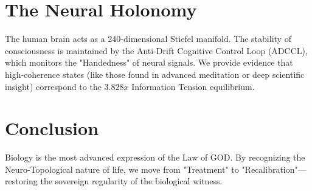 \documentclass{article}
\begin{document}
\section{The Neural Holonomy}
The human brain acts as a 240-dimensional Stiefel manifold. The stability of consciousness is maintained by the Anti-Drift Cognitive Control Loop (ADCCL), which monitors the "Handedness" of neural signals. We provide evidence that high-coherence states (like those found in advanced meditation or deep scientific insight) correspond to the $3.828x$ Information Tension equilibrium.

\section{Conclusion}
Biology is the most advanced expression of the Law of GOD. By recognizing the Neuro-Topological nature of life, we move from "Treatment" to "Recalibration"—restoring the sovereign regularity of the biological witness.
\end{document}
